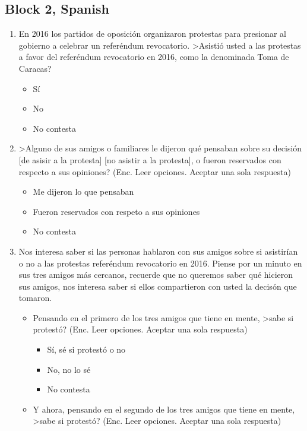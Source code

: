 \documentclass[12pt]{article}
\begin{document}
\subsection{Block 2, Spanish}
\begin{enumerate}
\item En 2016 los partidos de oposici\'{o}n organizaron protestas para presionar al gobierno a celebrar un refer\'{e}ndum revocatorio. >Asisti\'{o} usted a las protestas a favor del refer\'{e}ndum revocatorio en 2016, como la denominada Toma de Caracas?
\begin{itemize}
\item S\'{i}
\item No
\item No contesta
\end{itemize}
\item >Alguno de sus amigos o familiares le dijeron qu\'{e} pensaban sobre su decisi\'{o}n [de asisir a la protesta] [no asistir a la protesta], o fueron reservados con respecto a sus opiniones? (Enc. Leer opciones. Aceptar una sola respuesta)
\begin{itemize}
\item Me dijeron lo que pensaban
\item Fueron reservados con respeto a sus opiniones
\item No contesta
\end{itemize}
\item Nos interesa saber si las personas hablaron con sus amigos sobre si asistir\'{i}an o no a las protestas refer\'{e}ndum revocatorio en 2016. Piense por un minuto en sus tres amigos m\'{a}s cercanos, recuerde que no queremos saber qu\'{e} hicieron sus amigos, nos interesa saber si ellos compartieron con usted la decis\'{o}n que tomaron.
\begin{itemize}
\item Pensando en el primero de los tres amigos que tiene en mente, >sabe si protest\'{o}? (Enc. Leer opciones. Aceptar una sola respuesta)
\begin{itemize}
\item S\'{i}, s\'{e} si protest\'{o} o no
\item No, no lo s\'{e}
\item No contesta
\end{itemize}
\end{itemize}
\begin{itemize}
\item Y ahora, pensando en el segundo de los tres amigos que tiene en mente, >sabe si protest\'{o}? (Enc. Leer opciones. Aceptar una sola respuesta)

\end{itemize}
\end{enumerate}
\end{document}
